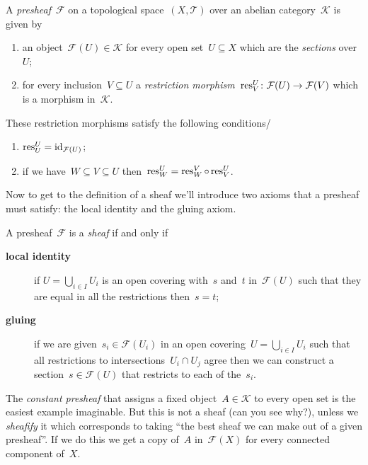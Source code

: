 \begin{definition}
  A \emph{presheaf}~$\mathcal{F}$ on a topological space~$(X,\mathcal{T})$ over an abelian category~$\mathcal{K}$ is given by
  \begin{enumerate}
    \item an object~$\mathcal{F}(U)\in\mathcal{K}$ for every open set~$U\subseteq X$ which are the \emph{sections} over~$U$;
    \item for every inclusion~$V\subseteq U$ a \emph{restriction morphism}~$\operatorname{res}^U_V\colon\mathcal{F}(U)\to\mathcal{F}(V)$ which is a morphism in~$\mathcal{K}$.
  \end{enumerate}

  These restriction morphisms satisfy the following conditions/
  \begin{enumerate}
    \item $\operatorname{res}^U_U=\operatorname{id}_{\mathcal{F}(U)}$;
    \item if we have~$W\subseteq V\subseteq U$ then~$\operatorname{res}^U_W=\operatorname{res}^V_W\circ\operatorname{res}^U_V$.
  \end{enumerate}
\end{definition}

Now to get to the definition of a sheaf we'll introduce two axioms that a presheaf must satisfy: the local identity and the gluing axiom.

\begin{definition}
  A presheaf~$\mathcal{F}$ is a \emph{sheaf} if and only if
  \begin{description}
    \item[\textbf{local identity}] if $U=\bigcup_{i\in I}U_i$ is an open covering with~$s$ and~$t$ in~$\mathcal{F}(U)$ such that they are equal in all the restrictions then~$s=t$;
    \item[\textbf{gluing}] if we are given~$s_i\in\mathcal{F}(U_i)$ in an open covering~$U=\bigcup_{i\in I}U_i$ such that all restrictions to intersections~$U_i\cap U_j$ agree then we can construct a section~$s\in\mathcal{F}(U)$ that restricts to each of the~$s_i$.
  \end{description}
\end{definition}

\begin{example}
  The \emph{constant presheaf} that assigns a fixed object~$A\in\mathcal{K}$ to every open set is the easiest example imaginable. But this is not a sheaf (can you see why?), unless we \emph{sheafify} it which corresponds to taking ``the best sheaf we can make out of a given presheaf''. If we do this we get a copy of~$A$ in~$\mathcal{F}(X)$ for every connected component of~$X$.
\end{example}

